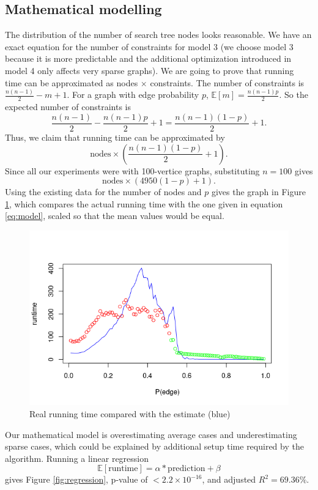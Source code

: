 \documentclass{article}
\begin{document}
\subsection{Mathematical modelling}
The distribution of the number of search tree nodes looks reasonable. We have an exact equation for the number of constraints for model 3 (we choose model 3 because it is more predictable and the additional optimization introduced in model 4 only affects very sparse graphs). We are going to prove that running time can be approximated as nodes $\times$ constraints. The number of constraints is $\frac{n(n-1)}{2}-m+1$. For a graph with edge probability $p$, $\mathbb{E}[m] = \frac{n(n-1)p}{2}$. So the expected number of constraints is
\[ \frac{n(n-1)}{2}-\frac{n(n-1)p}{2}+1=\frac{n(n-1)(1-p)}{2}+1. \]
Thus, we claim that running time can be approximated by
\[ \text{nodes}\times \left( \frac{n(n-1)(1-p)}{2} + 1 \right). \]
Since all our experiments were with 100-vertice graphs, substituting $n=100$ gives
\begin{equation}
  \text{nodes} \times (4950(1-p)+1).
  \label{eq:model}
\end{equation}
Using the existing data for the number of nodes and $p$ gives the graph in Figure \ref{fig:model}, which compares the actual running time with the one given in equation \ref{eq:model}, scaled so that the mean values would be equal.
\begin{figure}
  \includegraphics[scale=0.5]{model.png}
  \caption{Real running time compared with the estimate (blue)}
  \label{fig:model}
\end{figure}
Our mathematical model is overestimating average cases and underestimating sparse cases, which could be explained by additional setup time required by the algorithm. Running a linear regression
\[ \mathbb{E}[\text{runtime}] = \alpha * \text{prediction} + \beta \]
gives Figure \ref{fig:regression}, p-value of $ < 2.2\times 10^{-16}$, and adjusted $R^2 = 69.36\%$.
\end{document}
